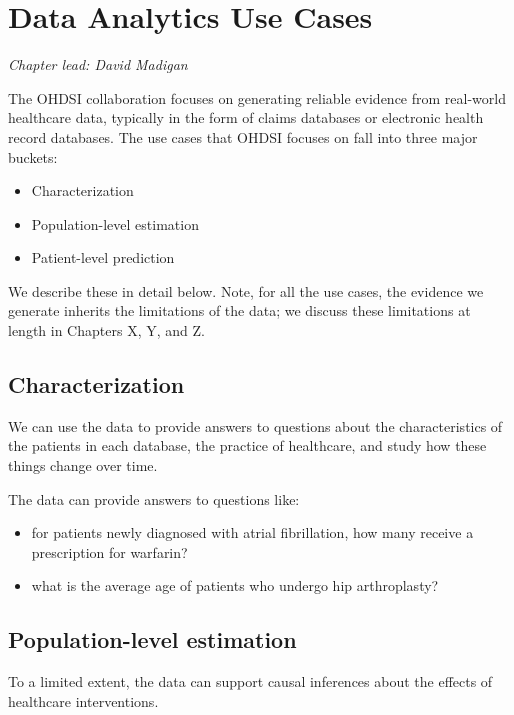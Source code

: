 \documentclass[]{book}
\providecommand{\tightlist}{%
  \setlength{\itemsep}{0pt}\setlength{\parskip}{0pt}}
\begin{document}
\chapter{Data Analytics Use Cases}\label{DataAnalyticsUseCases}

\emph{Chapter lead: David Madigan}

The OHDSI collaboration focuses on generating reliable evidence from
real-world healthcare data, typically in the form of claims databases or
electronic health record databases. The use cases that OHDSI focuses on
fall into three major buckets:

\begin{itemize}
\tightlist
\item
  Characterization
\item
  Population-level estimation
\item
  Patient-level prediction
\end{itemize}

We describe these in detail below. Note, for all the use cases, the
evidence we generate inherits the limitations of the data; we discuss
these limitations at length in Chapters X, Y, and Z.

\section{Characterization}\label{characterization}

We can use the data to provide answers to questions about the
characteristics of the patients in each database, the practice of
healthcare, and study how these things change over time.

The data can provide answers to questions like:

\begin{itemize}
\tightlist
\item
  for patients newly diagnosed with atrial fibrillation, how many
  receive a prescription for warfarin?
\item
  what is the average age of patients who undergo hip arthroplasty?
\end{itemize}

\section{Population-level estimation}\label{population-level-estimation}

To a limited extent, the data can support causal inferences about the
effects of healthcare interventions.
\end{document}
